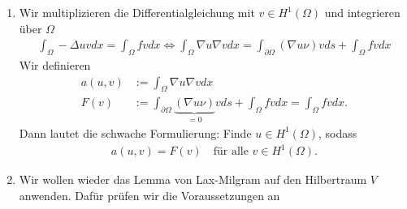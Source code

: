 \begin{solution}

\phantom{}
\begin{enumerate}[label = \alph*)]
  \item Wir multiplizieren die Differentialgleichung mit $v \in H^1(\Omega)$
  und integrieren über $\Omega$
  \begin{align*}
    \int_\Omega -\Delta u v dx = \int_\Omega fv dx \iff
    \int_\Omega \nabla u \nabla v dx = \int_{\partial\Omega}(\nabla u \nu)v ds + \int_\Omega fv dx
  \end{align*}
  Wir definieren
  \begin{align*}
    a(u,v) &:= \int_\Omega \nabla u \nabla v dx \\
    F(v) &:= \int_{\partial \Omega} \underbrace{(\nabla u \nu)}_{=0}v ds + \int_\Omega fv dx
    = \int_\Omega fv dx.
  \end{align*}
  Dann lautet die schwache Formulierung: Finde $u \in H^1(\Omega)$, sodass
  \begin{align*}
    a(u,v) = F(v) \quad \text{für alle } v \in H^1(\Omega).
  \end{align*}
  \item Wir wollen wieder das Lemma von Lax-Milgram auf den Hilbertraum $V$ anwenden. Dafür prüfen wir
  die Voraussetzungen an


\end{enumerate}
\end{solution}
